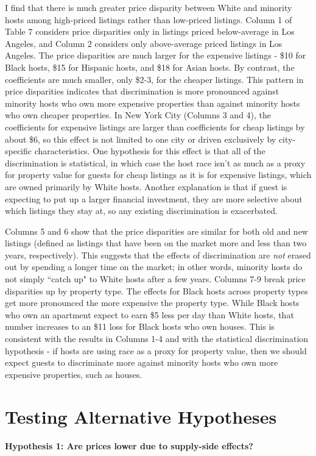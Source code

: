 \documentclass[11pt, oneside]{article}
\begin{document}
I find that there is much greater price disparity between White and minority hosts among high-priced listings rather than low-priced listings. Column 1 of Table 7 considers price disparities only in listings priced below-average in Los Angeles, and Column 2 considers only above-average priced listings in Los Angeles. The price disparities are much larger for the expensive listings - \$10 for Black hosts, \$15 for Hispanic hosts, and \$18 for Asian hosts. By contrast, the coefficients are much smaller, only \$2-3, for the cheaper listings. This pattern in price disparities indicates that discrimination is more pronounced against minority hosts who own more expensive properties than against minority hosts who own cheaper properties. In New York City (Columns 3 and 4), the coefficients for expensive listings are larger than coefficients for cheap listings by about \$6, so this effect is not limited to one city or driven exclusively by city-specific characteristics. One hypothesis for this effect is that all of the discrimination is statistical, in which case the host race isn't as much as a proxy for property value for guests for cheap listings  as it is for expensive listings, which are owned primarily by White hosts. Another explanation is that if guest is expecting to put up a larger financial investment, they are more selective about which listings they stay at, so any existing discrimination is exacerbated. 

Columns 5 and 6 show that the price disparities are similar for both old and new listings (defined as listings that have been on the market more and less than two years, respectively). This suggests that the effects of discrimination are \textit{not} erased out by spending a longer time on the market; in other words, minority hosts do not simply ``catch up" to White hosts after a few years. Columns 7-9 break price disparities up by property type. The effects for Black hosts across property types get more pronounced the more expensive the property type. While Black hosts who own an apartment expect to earn \$5 less per day than White hosts, that number increases to an \$11 loss for Black hosts who own houses. This is consistent with the results in Columns 1-4 and with the statistical discrimination hypothesis - if hosts are using race as a proxy for property value, then we should expect guests to discriminate more against minority hosts who own more expensive properties, such as houses.   


\section{Testing Alternative Hypotheses}
\textbf{Hypothesis 1: Are prices lower due to supply-side effects?}
\end{document}

